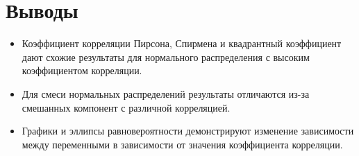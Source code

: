 \documentclass[a4paper]{article}
\begin{document}
    \section{Выводы}\label{sec:conclusions}
    \begin{itemize}
        \item Коэффициент корреляции Пирсона, Спирмена и квадрантный коэффициент дают схожие результаты для нормального распределения с высоким коэффициентом корреляции.
        \item Для смеси нормальных распределений результаты отличаются из-за смешанных компонент с различной корреляцией.
        \item Графики и эллипсы равновероятности демонстрируют изменение зависимости между переменными в зависимости от значения коэффициента корреляции.
    \end{itemize}
\end{document}
